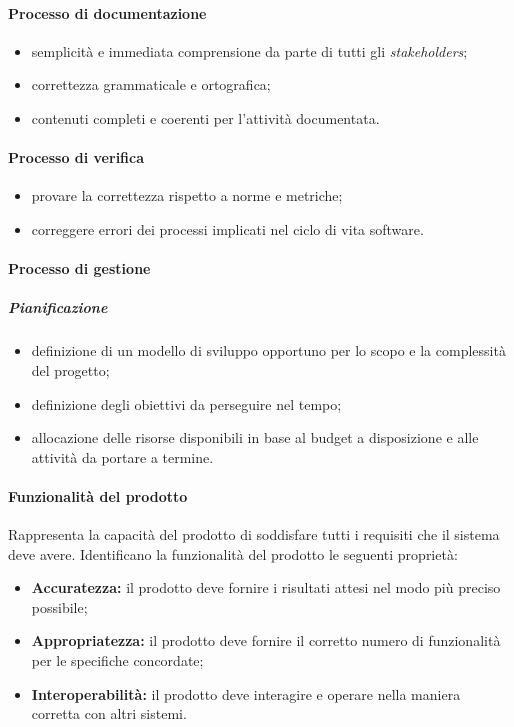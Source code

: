 \paragraph{Processo di documentazione}
\begin{itemize}
	\item semplicità e immediata comprensione da parte di tutti gli \textit{stakeholders\glo};
	\item correttezza grammaticale e ortografica;
	\item contenuti completi e coerenti per l'attività documentata.
\end{itemize}

\paragraph{Processo di verifica}
\begin{itemize}
	\item provare la correttezza rispetto a norme e metriche;
	\item correggere errori dei processi implicati nel ciclo di vita software.
\end{itemize}

\paragraph{Processo di gestione}
\subparagraph*{Pianificazione}
\begin{itemize}
	\item definizione di un modello di sviluppo opportuno per lo scopo e la complessità del progetto;
	\item definizione degli obiettivi da perseguire nel tempo;
	\item allocazione delle risorse disponibili in base al budget a disposizione e alle attività da portare a termine.
\end{itemize}

\paragraph{Funzionalità del prodotto}
Rappresenta la capacità del prodotto di soddisfare tutti i requisiti che il sistema deve avere. Identificano la funzionalità del prodotto le seguenti proprietà:
\begin{itemize}
	\item \textbf{Accuratezza:} il prodotto deve fornire i risultati attesi nel modo più preciso possibile;
	\item \textbf{Appropriatezza:} il prodotto deve fornire il corretto numero di funzionalità per le specifiche concordate;
	\item \textbf{Interoperabilità:} il prodotto deve interagire e operare nella maniera corretta con altri sistemi.
\end{itemize}

